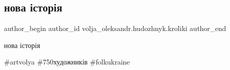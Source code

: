  
 
 
 
 

\subsection{нова історія}
\label{sec:12_03_2018.fb.volja_oleksandr.hudozhnyk.kroliki.1.nova_istoria_orig}

\ifcmt
 author_begin
   author_id volja_oleksandr.hudozhnyk.kroliki
 author_end
\fi

нова історія🐇

\#artvolya \#750художників \#folkukraine

